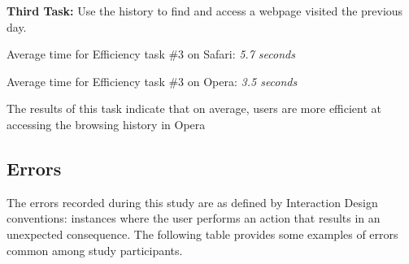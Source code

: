 \documentclass{article}
\begin{document}
\clearpage

\par
\textbf{Third Task: } Use the history to find and access a webpage visited the previous day.
\begin{center}

\par Average time for Efficiency task \#3 on Safari: \textit{5.7 seconds}
\par Average time for Efficiency task \#3 on Opera: \textit{3.5 seconds}
\end{center}
\par \noindent The results of this task indicate that on average, users are more efficient at accessing the browsing history in Opera

\clearpage

\subsection{Errors}
\par The errors recorded during this study are as defined by Interaction Design conventions: instances where the user performs an action that results in an unexpected consequence. The following table provides some examples of errors common among study participants.
\end{document}
